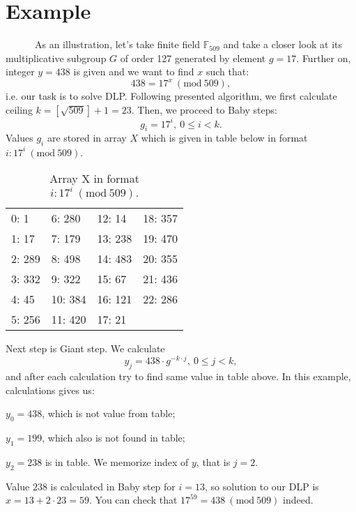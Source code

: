 \documentclass[fleqn,10pt]{olplainarticle}
\begin{document}
\section*{Example}

\par \ \ \ \ \ \ As an illustration, let's take finite field $\mathbb{F}_{509}$ and take a closer look 
at its multiplicative subgroup $G$ of order 127 generated by element $g=17$. Further on, 
integer $y=438$ is given and we want to find $x$ such that:
$$438=17^x\ (\textrm {mod}\ 509),$$
i.e. our task is to solve DLP.
Following presented algorithm, we first calculate ceiling $k=[\sqrt{509}]+1=23$. 
Then, we proceed to Baby steps:
$$g_i = 17^i,\ 0\leq i < k.$$
Values $g_i$ are stored in array $X$ which is given in table below in format $i: 17^i\ (\textrm{mod}\ 509).$

\begin{table}[ht]
\centering
\begin{tabular}{|l|l|l|l|}
  0: 1   & 6: 280  & 12: 14 & 18: 357\\
  1: 17  & 7: 179 & 13: 238 & 19: 470 \\
  2: 289 & 8:  498 & 14: 483 & 20: 355\\
  3: 332 & 9:  322 & 15: 67 & 21: 436 \\
  4: 45 & 10: 384 & 16: 121 & 22: 286\\
  5: 256 & 11: 420 & 17: 21 
\end{tabular}
\caption{\label{tab:widgets}Array X in format $i: 17^i\ (\textrm{mod}\ 509).$}
\end{table}


Next step is Giant step. We calculate
$$y_j = 438\cdot g^{-k\cdot j},\ 0\leq j< k,$$
and after each calculation try to find same value in table above. In this example, 
calculations gives us:

$y_0 = 438$, which is not value from table; 

$y_1 = 199$, which also is not found in table; 

$y_2=238$ is in table. We memorize index of $y$, that is $j=2$.

Value $238$ is calculated in Baby step for $i=13$, so solution to our DLP is $x=13+2\cdot 23=59.$ 
You can check that $17^{59}=438\ (\textrm{mod}\ 509)$ indeed.
\end{document}
